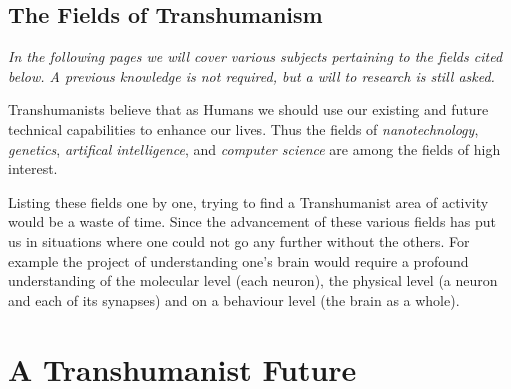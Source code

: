 \documentclass[
			12pt,
			a4paper,
			cleardoublepage=empty,
			final,
			twoside
				]{scrbook}
\begin{document}
    \subsection{The Fields of Transhumanism}
      \begin{par}
       \emph{ In the following pages we will cover various subjects pertaining to the fields cited below. A previous knowledge is not required, but a will to research is still asked.} \\
      \end{par}
      \begin{par}
	      Transhumanists believe that as Humans we should use our existing and future technical capabilities to enhance our lives. 
	      Thus the fields of \emph{nanotechnology}, \emph{genetics}, \emph{artifical intelligence}, and \emph{computer science} are among the fields of high interest.
      \end{par}
      \begin{par}
        Listing these fields one by one, trying to find a Transhumanist area of activity would be a waste of time. Since the advancement of these various fields has put us in situations where one could not go any further without the others. For example the project of understanding one's brain would require a profound understanding of the molecular level (each neuron), the physical level (a neuron and each of its synapses) and on a behaviour level (the brain as a whole). 
      \end{par}

  \section{A Transhumanist Future}
\end{document}
